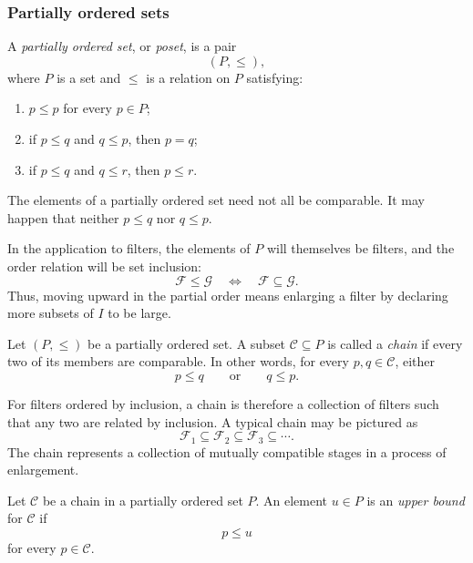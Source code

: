 {\subsubsection{Partially ordered sets}

\begin{defn}
A \emph{partially ordered set}, or \emph{poset}, is a pair
\[
(P,\leq),
\]
where \(P\) is a set and \(\leq\) is a relation on \(P\) satisfying:
\begin{enumerate}
    \item \(p\leq p\) for every \(p\in P\);
    \item if \(p\leq q\) and \(q\leq p\), then \(p=q\);
    \item if \(p\leq q\) and \(q\leq r\), then \(p\leq r\).
\end{enumerate}

The elements of a partially ordered set need not all be comparable. It may
happen that neither \(p\leq q\) nor \(q\leq p\).
\end{defn}

In the application to filters, the elements of \(P\) will themselves be
filters, and the order relation will be set inclusion:
\[
\mathcal{F}\leq\mathcal{G}
\quad\Longleftrightarrow\quad
\mathcal{F}\subseteq\mathcal{G}.
\]
Thus, moving upward in the partial order means enlarging a filter by
declaring more subsets of \(I\) to be large.

\begin{defn}[Chain]
Let \((P,\leq)\) be a partially ordered set. A subset
\(\mathcal{C}\subseteq P\) is called a \emph{chain} if every two of its
members are comparable. In other words, for every \(p,q\in\mathcal{C}\),
either
\[
p\leq q
\qquad\text{or}\qquad
q\leq p.
\]
\end{defn}

For filters ordered by inclusion, a chain is therefore a collection of
filters such that any two are related by inclusion. A typical chain may be
pictured as
\[
\mathcal{F}_1
\subseteq
\mathcal{F}_2
\subseteq
\mathcal{F}_3
\subseteq
\cdots.
\]
The chain represents a collection of mutually compatible stages in a
process of enlargement.

\begin{defn}
Let \(\mathcal{C}\) be a chain in a partially ordered set \(P\). An element
\(u\in P\) is an \emph{upper bound} for \(\mathcal{C}\) if
\[
p\leq u
\]
for every \(p\in\mathcal{C}\).
\end{defn}

}
